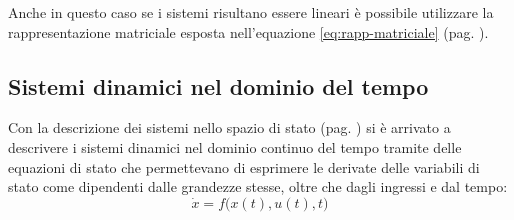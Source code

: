		Anche in questo caso se i sistemi risultano essere lineari è possibile utilizzare la rappresentazione matriciale esposta nell'equazione \ref{eq:rapp-matriciale} (pag. \pageref{eq:rapp-matriciale}).
	
	\subsection{Sistemi dinamici nel dominio del tempo}
		Con la descrizione dei sistemi nello spazio di stato (pag. \pageref{sec:intro:spaziostato}) si è arrivato a descrivere i sistemi dinamici nel dominio continuo del tempo tramite delle equazioni di stato che permettevano di esprimere le derivate delle variabili di stato come dipendenti dalle grandezze stesse, oltre che dagli ingressi e dal tempo:
		\[ \dot x = f\Big(x(t), u(t), t\Big)\]
		
		
